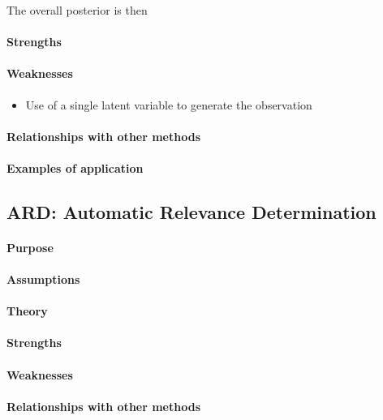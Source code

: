 The overall posterior is then
\begin{center}
\end{center}




\paragraph{Strengths}

\paragraph{Weaknesses}
\begin{itemize}
    \item Use of a single latent variable to generate the observation
\end{itemize}

\paragraph{Relationships with other methods}
\paragraph{Examples of application}


\subsection{ARD: Automatic Relevance Determination}
\paragraph{Purpose}
\paragraph{Assumptions}
\paragraph{Theory}
\paragraph{Strengths}
\paragraph{Weaknesses}
\paragraph{Relationships with other methods}

